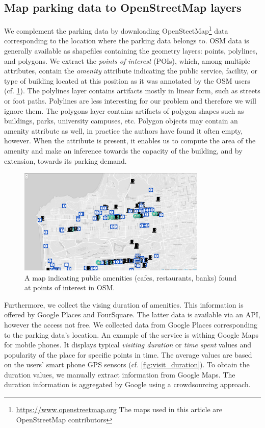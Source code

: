 \documentclass{ws-ijait}
\begin{document}
	\subsection{Map parking data to OpenStreetMap layers}
	We complement the parking data by downloading OpenSteetMap\footnote{\url{https://www.openstreetmap.org} The maps used in this article are \textcopyright OpenStreetMap contributors} data corresponding to the location where the parking data belongs to. OSM data is generally available as shapefiles containing the geometry layers: points, polylines, and polygons. We extract the \textit{points of interest} (POIs), which, among multiple attributes, contain the \textit{amenity} attribute indicating the public service, facility, or type of building located at this position as it was annotated by the OSM users (cf. \cref{fig:pois}). The polylines layer contains artifacts mostly in linear form, such as streets or foot paths. Polylines are less interesting for our problem and therefore we will ignore them. The polygons layer contains artifacts of polygon shapes such as buildings, parks, university campuses, etc. Polygon objects may contain an amenity attribute as well, in practice the authors have found it often empty, however. When the attribute is present, it enables us to compute the area of the amenity and make an inference towards the capacity of the building, and by extension, towards its parking demand.
	
	\begin{figure}[!ht]
		\centering
		\includegraphics[width=0.8\textwidth]{graphics/cafes_restaurants_banks_larger.png}
		\caption{A map indicating public amenities (cafes, restaurants, banks) found at points of interest in OSM.}
		\label{fig:pois}
	\end{figure}
	
	Furthermore, we collect the vising duration of amenities. This information is offered by Google Places and FourSquare. The latter data is available via an API, however the access not free. We collected data from Google Places corresponding to the parking data's location. An example of the service is withing Google Maps for mobile phones. It displays typical \textit{visiting duration} or \textit{time spent} values and popularity of the place for specific points in time. The average values are based on the users' smart phone GPS sensors (cf. \cref{fig:visit_duration}). To obtain the duration values, we manually extract information from Google Maps. The duration information is aggregated by Google using a crowdsourcing approach. 
	
\end{document}
